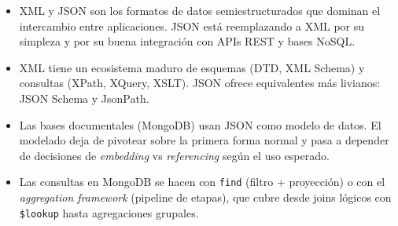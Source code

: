 \documentclass[11pt,a4paper]{article}
\begin{document}
\begin{itemize}
    \item XML y JSON son los formatos de datos semiestructurados que
    dominan el intercambio entre aplicaciones. JSON está reemplazando a
    XML por su simpleza y por su buena integración con APIs REST y
    bases NoSQL.
    \item XML tiene un ecosistema maduro de esquemas (DTD, XML Schema)
    y consultas (XPath, XQuery, XSLT). JSON ofrece equivalentes más
    livianos: JSON Schema y JsonPath.
    \item Las bases documentales (MongoDB) usan JSON como modelo de
    datos. El modelado deja de pivotear sobre la primera forma normal y
    pasa a depender de decisiones de \emph{embedding} vs
    \emph{referencing} según el uso esperado.
    \item Las consultas en MongoDB se hacen con \texttt{find}
    (filtro + proyección) o con el \emph{aggregation framework}
    (pipeline de etapas), que cubre desde joins lógicos con
    \texttt{\$lookup} hasta agregaciones grupales.
\end{itemize}
\end{document}
